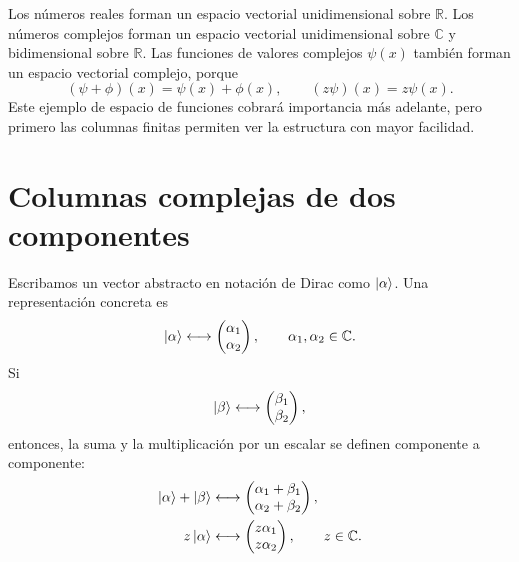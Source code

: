Los números reales forman un espacio vectorial unidimensional sobre \(\mathbb R\). Los números complejos forman un espacio vectorial unidimensional sobre \(\mathbb C\) y bidimensional sobre \(\mathbb R\). Las funciones de valores complejos \(\psi(x)\) también forman un espacio vectorial complejo, porque
\begin{equation}
  (\psi+\phi)(x)=\psi(x)+\phi(x),
  \qquad
  (z\psi)(x)=z\psi(x).
\end{equation}
Este ejemplo de espacio de funciones cobrará importancia más adelante, pero primero las columnas finitas permiten ver la estructura con mayor facilidad.

\begin{classroomqa}
\end{classroomqa}

\section{Columnas complejas de dos componentes}

Escribamos un vector abstracto en notación de Dirac como \(\left\lvert\alpha\right\rangle\). Una representación concreta es
\begin{equation}
  \left\lvert\alpha\right\rangle
  \longleftrightarrow
  \begin{pmatrix}
    \alpha_1\\
    \alpha_2
  \end{pmatrix},
  \qquad
  \alpha_1,\alpha_2\in\mathbb C.
\end{equation}
Si
\begin{equation}
  \left\lvert\beta\right\rangle
  \longleftrightarrow
  \begin{pmatrix}
    \beta_1\\
    \beta_2
  \end{pmatrix},
\end{equation}
entonces, la suma y la multiplicación por un escalar se definen componente a componente:
\begin{align}
  \left\lvert\alpha\right\rangle+\left\lvert\beta\right\rangle
  &\longleftrightarrow
  \begin{pmatrix}
    \alpha_1+\beta_1\\
    \alpha_2+\beta_2
  \end{pmatrix},\\
  z\left\lvert\alpha\right\rangle
  &\longleftrightarrow
  \begin{pmatrix}
    z\alpha_1\\
    z\alpha_2
  \end{pmatrix},
  \qquad z\in\mathbb C.
\end{align}

